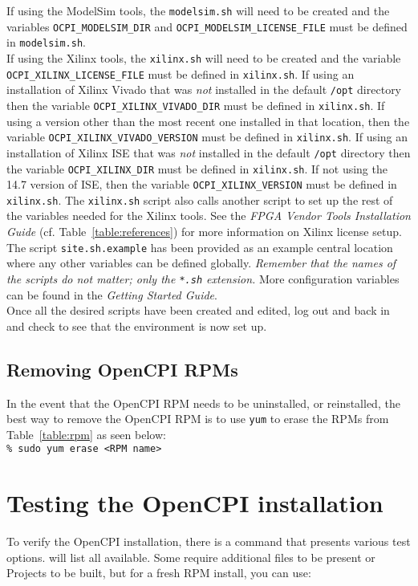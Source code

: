 If using the ModelSim tools, the \verb+modelsim.sh+ will need to be created and the variables \verb+OCPI_MODELSIM_DIR+ and \verb+OCPI_MODELSIM_LICENSE_FILE+ must be defined in \verb+modelsim.sh+.\\

If using the Xilinx tools, the \verb+xilinx.sh+ will need to be created and the variable \verb+OCPI_XILINX_LICENSE_FILE+ must be defined in \verb+xilinx.sh+. If using an installation of Xilinx Vivado that was \textit{not} installed in the default \verb+/opt+ directory then the variable \verb+OCPI_XILINX_VIVADO_DIR+ must be defined in \verb+xilinx.sh+. If using a version other than the most recent one installed in that location, then the variable \verb+OCPI_XILINX_VIVADO_VERSION+ must be defined in \verb+xilinx.sh+. If using an installation of Xilinx ISE that was \textit{not} installed in the default \verb+/opt+ directory then the variable \verb+OCPI_XILINX_DIR+ must be defined in \verb+xilinx.sh+. If not using the 14.7 version of ISE, then the variable \verb+OCPI_XILINX_VERSION+ must be defined in \verb+xilinx.sh+. The \verb+xilinx.sh+ script also calls another script to set up the rest of the variables needed for the Xilinx tools. See the \textit{FPGA Vendor Tools Installation Guide} (cf. Table~\ref{table:references}) for more information on Xilinx license setup.\\

The script \verb+site.sh.example+ has been provided as an example central location where any other variables can be defined globally. \textit{Remember that the names of the scripts do not matter; only the \texttt{*.sh} extension.} More configuration variables can be found in the \textit{Getting Started Guide}.\\

Once all the desired scripts have been created and edited, log out and back in and check to see that the environment is now set up.

\subsection{Removing OpenCPI RPMs}
In the event that the OpenCPI RPM needs to be uninstalled, or reinstalled, the best way to remove the OpenCPI RPM is to use \verb+yum+ to erase the RPMs from Table~\ref{table:rpm} as seen below:\\

	\verb+% sudo yum erase <RPM name>+

\section{Testing the OpenCPI installation}
\label{sec:testing_opencpi}
To verify the OpenCPI installation, there is a command  that presents various test options.  will list all available. Some require additional files to be present or Projects to be built, but for a fresh RPM install, you can use:\\

